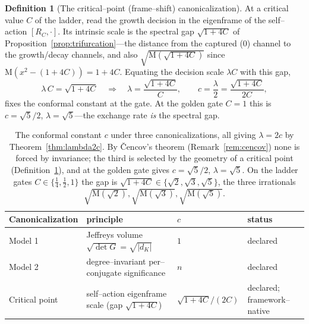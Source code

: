 \documentclass[11pt]{article}
\theoremstyle{plain}
\theoremstyle{definition}
\newtheorem{definition}[theorem]{Definition}
\theoremstyle{remark}
\newcommand{\K}{K}
\newcommand{\Mah}{\mathrm{M}}
\newcommand{\GG}{G}
\begin{document}
\begin{definition}[The critical--point (frame--shift) canonicalization]\label{def:frameshift}
At a critical value $C$ of the ladder, read the growth decision in the eigenframe of the self--action
$[R_C,\cdot]$. Its intrinsic scale is the spectral gap $\sqrt{1+4C}$ of Proposition~\ref{prop:trifurcation}---the
distance from the captured ($0$) channel to the growth/decay channels, and also $\sqrt{\Mah(\sqrt{1+4C})}$ since
$\Mah(x^2-(1+4C))=1+4C$. Equating the decision scale $\lambda C$ with this gap,
\begin{equation}\label{eq:frameshift}
  \lambda\,C=\sqrt{1+4C}\quad\Longrightarrow\quad
  \lambda=\frac{\sqrt{1+4C}}{C},\qquad c=\frac{\lambda}{2}=\frac{\sqrt{1+4C}}{2C},
\end{equation}
fixes the conformal constant at the gate. At the golden gate $C=1$ this is $c=\sqrt5/2$, $\lambda=\sqrt5$---the
exchange rate \emph{is} the spectral gap.
\end{definition}

\begin{table}[t]\centering
\small
\begin{tabular}{llll}
\toprule
Canonicalization & principle & $c$ & status \\
\midrule
Model 1 & Jeffreys volume $\sqrt{\det\GG}=\sqrt{|d_\K|}$ & $1$ & declared \cite{Jeffreys} \\
Model 2 & degree--invariant per--conjugate significance & $n$ & declared \\
Critical point & self--action eigenframe scale (gap $\sqrt{1+4C}$) & $\sqrt{1+4C}/(2C)$ & declared; framework--native \\
\bottomrule
\end{tabular}
\caption{The conformal constant $c$ under three canonicalizations, all giving $\lambda=2c$ by
Theorem~\ref{thm:lambda2c}. By \v{C}encov's theorem (Remark~\ref{rem:cencov}) none is forced by invariance; the
third is selected by the geometry of a critical point (Definition~\ref{def:frameshift}), and at the golden gate
gives $c=\sqrt5/2$, $\lambda=\sqrt5$. On the ladder gates $C\in\{\tfrac14,\tfrac12,1\}$ the gap is
$\sqrt{1+4C}\in\{\sqrt2,\sqrt3,\sqrt5\}$, the three irrationals $\sqrt{\Mah(\sqrt2)},\sqrt{\Mah(\sqrt3)},
\sqrt{\Mah(\sqrt5)}$.}
\label{tab:canon}
\end{table}
\end{document}
